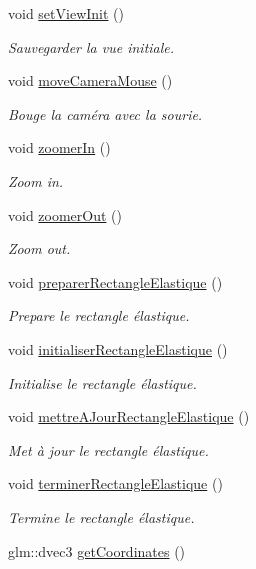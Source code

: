 \begin{DoxyCompactItemize}
void \hyperlink{group__inf2990_gab3bc1f3520b17ed3d19287f3d411dd82}{set\-View\-Init} ()
\begin{DoxyCompactList}\small\item\em Sauvegarder la vue initiale. \end{DoxyCompactList}\item 
void \hyperlink{group__inf2990_gaba7107809948a77f8ef3bf2240bc2bc4}{move\-Camera\-Mouse} ()
\begin{DoxyCompactList}\small\item\em Bouge la caméra avec la sourie. \end{DoxyCompactList}\item 
void \hyperlink{group__inf2990_ga8f027fa8ccba48bada7b91b1bc32ed96}{zoomer\-In} ()
\begin{DoxyCompactList}\small\item\em Zoom in. \end{DoxyCompactList}\item 
void \hyperlink{group__inf2990_gaa2e1aeaa2fd10b16cf8b5f406d6270c8}{zoomer\-Out} ()
\begin{DoxyCompactList}\small\item\em Zoom out. \end{DoxyCompactList}\item 
void \hyperlink{group__inf2990_gaa5ea001f334158926e6c701478926ae9}{preparer\-Rectangle\-Elastique} ()
\begin{DoxyCompactList}\small\item\em Prepare le rectangle élastique. \end{DoxyCompactList}\item 
void \hyperlink{group__inf2990_ga6ccf25bd92d3bae6dfeebaf051c768f4}{initialiser\-Rectangle\-Elastique} ()
\begin{DoxyCompactList}\small\item\em Initialise le rectangle élastique. \end{DoxyCompactList}\item 
void \hyperlink{group__inf2990_ga382ae0540038d9ef65673af9d5d1b164}{mettre\-A\-Jour\-Rectangle\-Elastique} ()
\begin{DoxyCompactList}\small\item\em Met à jour le rectangle élastique. \end{DoxyCompactList}\item 
void \hyperlink{group__inf2990_ga1c99d4d88f05b70a20b36b51c07f31cf}{terminer\-Rectangle\-Elastique} ()
\begin{DoxyCompactList}\small\item\em Termine le rectangle élastique. \end{DoxyCompactList}\item 
\hypertarget{group__inf2990_ga4c28397e45d882d3d982ed68978e9e20}{glm\-::dvec3 \hyperlink{group__inf2990_ga4c28397e45d882d3d982ed68978e9e20}{get\-Coordinates} ()}\label{group__inf2990_ga4c28397e45d882d3d982ed68978e9e20}


\end{DoxyCompactItemize}
